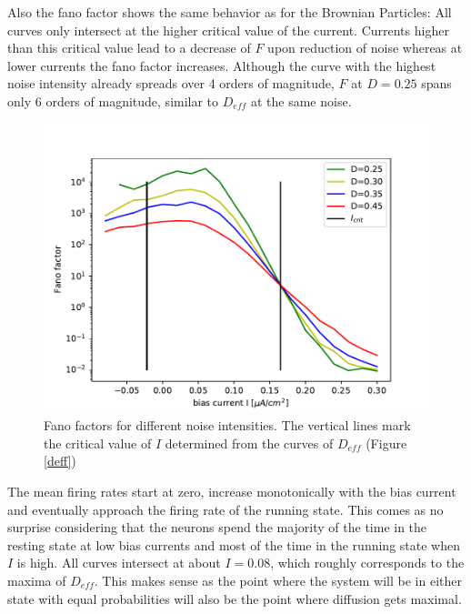 \documentclass[12pt,a4paper]{article}
\begin{document}
Also the fano factor shows the same behavior as for the Brownian Particles: All curves only intersect at the higher critical value of the current. Currents higher than this critical value lead to a decrease of $F$ upon reduction of noise whereas at lower currents the fano factor increases. Although the curve with the highest noise intensity already spreads over 4 orders of magnitude, $F$ at $D=0.25$ spans only 6 orders of magnitude, similar to $D_{eff}$ at the same noise.
\begin{figure}[H]
	\centering
	\includegraphics[scale=1]{fanocrit.pdf}\caption{Fano factors for different noise intensities. The vertical lines mark the critical value of $I$ determined from the curves of $D_{eff}$ (Figure \ref{deff})}
	\label{fano}
\end{figure}
The mean firing rates start at zero, increase monotonically with the bias current and eventually approach the firing rate of the running state. This comes as no surprise considering that the neurons spend the majority of the time in the resting state at low bias currents and most of the time in the running state when $I$ is high. All curves intersect at about $I=0.08$, which roughly corresponds to the maxima of $D_{eff}$. This makes sense as the point where the system will be in either state with equal probabilities will also be the point where diffusion gets maximal.
\end{document}
